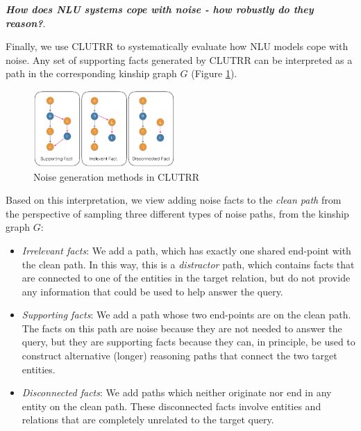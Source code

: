 \documentclass[12pt]{article}
\newcommand{\xhdr}[1]{{\noindent\bfseries #1}.}
\begin{document}
\xhdr{\textit{How does NLU systems cope with noise - how robustly do they reason?}}

Finally, we use CLUTRR to systematically evaluate how NLU models cope with noise.
Any set of supporting facts generated by CLUTRR can be interpreted as a path in the corresponding kinship graph $G$ (Figure \ref{fig:clutrr_data_noise}).

\begin{figure}
\begin{center}
  \includegraphics[width=0.48\textwidth]{images/clutrr_noise.png}
\end{center}
\caption{Noise generation methods in CLUTRR}
\label{fig:clutrr_data_noise}
\end{figure}

Based on this interpretation, we view adding noise facts to the \textit{clean path} from the perspective of sampling three different types of noise paths, from the kinship graph $G$:

\begin{itemize}
    \item \textit{Irrelevant facts}: We add a path, which has exactly one shared end-point with the clean path. In this way, this is a \textit{distractor} path,
    which contains facts that are connected to one of the entities in the target relation, but do not provide any information that could be used to help answer the query. %
     \item \textit{Supporting facts}:
    We add a path whose two end-points are on the clean path.
    The facts on this path are noise because they are not needed to answer the query, but they are supporting facts because they can, in principle, be used to construct alternative (longer) reasoning paths that connect the two target entities.
    \item \textit{Disconnected facts}: We add paths which neither originate nor end in any entity on the clean path. These disconnected facts involve entities and relations that are completely unrelated to the target query.
\end{itemize}
\end{document}

